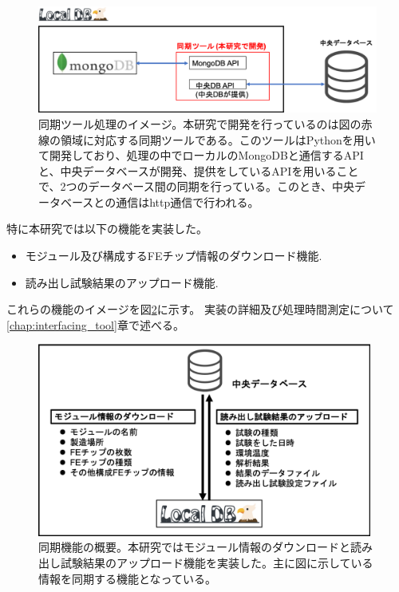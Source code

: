 \begin{figure}[bpt]\centering
\includegraphics[width=13cm]{./interfacing_tools_system.png}
\caption[同期ツール処理のイメージ]{同期ツール処理のイメージ。本研究で開発を行っているのは図の赤線の領域に対応する同期ツールである。このツールはPythonを用いて開発しており、処理の中でローカルのMongoDBと通信するAPIと、中央データベースが開発、提供をしているAPIを用いることで、2つのデータベース間の同期を行っている。このとき、中央データベースとの通信はhttp通信で行われる。}
\label{interfacing_tools_system}
\end{figure}

特に本研究では以下の機能を実装した。
\begin{itemize}
  \item モジュール及び構成するFEチップ情報のダウンロード機能.
  \item 読み出し試験結果のアップロード機能.
\end{itemize}

これらの機能のイメージを図\ref{interface_overview}に示す。
実装の詳細及び処理時間測定について\ref{chap:interfacing_tool}章で述べる。

\begin{figure}[bpt]\centering
\includegraphics[width=11cm]{./interface_overview.png}
\caption[同期機能の概要]{同期機能の概要。本研究ではモジュール情報のダウンロードと読み出し試験結果のアップロード機能を実装した。主に図に示している情報を同期する機能となっている。}
\label{interface_overview}
\end{figure}

